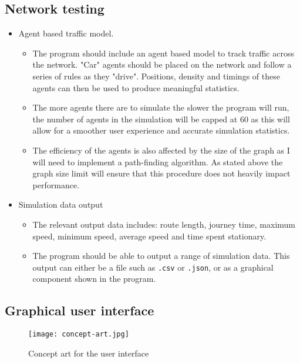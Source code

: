     \subsection{Network testing}
    \begin{itemize}
        \item Agent based traffic model.
        \begin{itemize}
            \item The program should include an agent based model to track traffic across the network. "Car" agents should be placed on the network and follow a series of rules as they "drive". Positions, density and timings of these agents can then be used to produce meaningful statistics.
            \item The more agents there are to simulate the slower the program will run, the number of agents in the simulation will be capped at 60 as this will allow for a smoother user experience and accurate simulation statistics.
            \item The efficiency of the agents is also affected by the size of the graph as I will need to implement a path-finding algorithm. As stated above the graph size limit will ensure that this procedure does not heavily impact performance.
        \end{itemize}
        \item Simulation data output
        \begin{itemize}
            \item The relevant output data includes: route length, journey time, maximum speed, minimum speed, average speed and time spent stationary.
            \item The program should be able to output a range of simulation data. This output can either be a file such as \texttt{.csv} or \texttt{.json}, or as a graphical component shown in the program.
        \end{itemize}
    \end{itemize}

    \subsection{Graphical user interface}
    \label{requirements-GUI}

    \begin{figure}[ht]
        \centering
        \texttt{[image: concept-art.jpg]}
        \caption{Concept art for the user interface}
    \end{figure}

